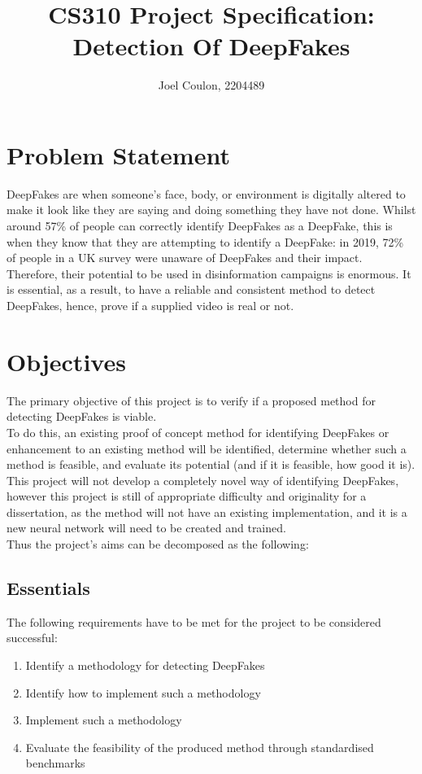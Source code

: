 \documentclass{article}
\title{CS310 Project Specification: Detection Of DeepFakes}
\author{Joel Coulon, 2204489}
\date{}
\begin{document}
\maketitle

\section{Problem Statement}
DeepFakes are when someone's face, body, or environment is digitally altered to make it look like they are saying and doing something they have not done. Whilst around 57\% of people can correctly identify DeepFakes as a DeepFake\cite{human-detection}, this is when they know that they are attempting to identify a DeepFake: in 2019, 72\% of people in a UK survey were unaware of DeepFakes and their impact\cite{human-aware}. Therefore, their potential to be used in disinformation campaigns is enormous. It is essential, as a result, to have a reliable and consistent method to detect DeepFakes, hence, prove if a supplied video is real or not.


\section{Objectives}
The primary objective of this project is to verify if a proposed method for detecting DeepFakes is viable.\\

To do this, an existing proof of concept method for identifying DeepFakes or enhancement to an existing method will be identified, determine whether such a method is feasible, and evaluate its potential (and if it is feasible, how good it is). This project will not develop a completely novel way of identifying DeepFakes, however this project is still of appropriate difficulty and originality for a dissertation, as the method will not have an existing implementation, and it is a new neural network will need to be created and trained. \\

\noindent
Thus the project's aims can be decomposed as the following:

\subsection{Essentials}
The following requirements have to be met for the project to be considered successful:
\begin{enumerate}
    \item Identify a methodology for detecting DeepFakes
    \item Identify how to implement such a methodology
    \item Implement such a methodology
    \item Evaluate the feasibility of the produced method through standardised benchmarks
\end{enumerate}
\end{document}
